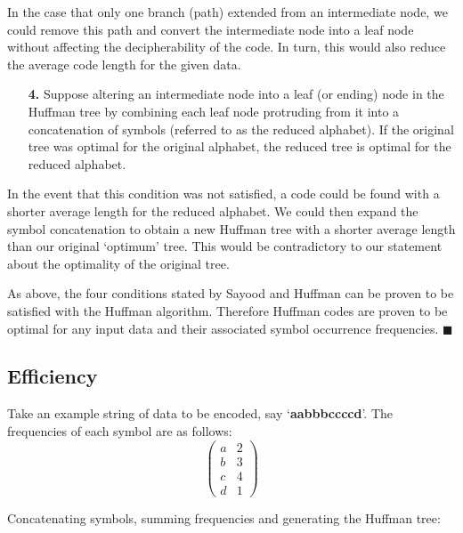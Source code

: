 \documentclass[12pt]{article}
\begin{document}
In the case that only one branch (path) extended from an intermediate node, we could remove this path and convert the intermediate node into a leaf node without affecting the decipherability of the code. In turn, this would also reduce the average code length for the given data.
\begin{enumerate}
	\item[\textbf{4.}] Suppose altering an intermediate node into a leaf (or ending) node in the Huffman tree by combining each leaf node protruding from it into a concatenation of symbols (referred to as the reduced alphabet). If the original tree was optimal for the original alphabet, the reduced tree is optimal for the reduced alphabet.
\end{enumerate}
In the event that this condition was not satisfied, a code could be found with a shorter average length for the reduced alphabet. We could then expand the symbol concatenation to obtain a new Huffman tree with a shorter average length than our original `optimum' tree. This would be contradictory to our statement about the optimality of the original tree.

As above, the four conditions stated by Sayood and Huffman can be proven to be satisfied with the Huffman algorithm. Therefore Huffman codes are proven to be optimal for any input data and their associated symbol occurrence frequencies. \hfill$\blacksquare$

\subsection{Efficiency}
Take an example string of data to be encoded, say `\textbf{aabbbccccd}'. The frequencies of each symbol are as follows:
\begin{equation*}
\begin{pmatrix}
a & 2 \\
b & 3 \\
c & 4 \\
d & 1
\end{pmatrix}
\end{equation*}

Concatenating symbols, summing frequencies and generating the Huffman tree:
\end{document}
